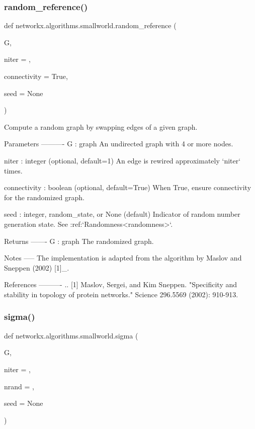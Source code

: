 \subsubsection{\texorpdfstring{random\+\_\+reference()}{random\_reference()}}
{\footnotesize\ttfamily def networkx.\+algorithms.\+smallworld.\+random\+\_\+reference (\begin{DoxyParamCaption}\item[{}]{G,  }\item[{}]{niter = {},  }\item[{}]{connectivity = {\ttfamily True},  }\item[{}]{seed = {\ttfamily None} }\end{DoxyParamCaption})}

\begin{DoxyVerb}Compute a random graph by swapping edges of a given graph.

Parameters
----------
G : graph
    An undirected graph with 4 or more nodes.

niter : integer (optional, default=1)
    An edge is rewired approximately `niter` times.

connectivity : boolean (optional, default=True)
    When True, ensure connectivity for the randomized graph.

seed : integer, random_state, or None (default)
    Indicator of random number generation state.
    See :ref:`Randomness<randomness>`.

Returns
-------
G : graph
    The randomized graph.

Notes
-----
The implementation is adapted from the algorithm by Maslov and Sneppen
(2002) [1]_.

References
----------
.. [1] Maslov, Sergei, and Kim Sneppen.
       "Specificity and stability in topology of protein networks."
       Science 296.5569 (2002): 910-913.
\end{DoxyVerb}
 \mbox{\label{namespacenetworkx_1_1algorithms_1_1smallworld_a4bce7f8ef34970dbdbe4e20991db7b19}} 
\subsubsection{\texorpdfstring{sigma()}{sigma()}}
{\footnotesize\ttfamily def networkx.\+algorithms.\+smallworld.\+sigma (\begin{DoxyParamCaption}\item[{}]{G,  }\item[{}]{niter = {},  }\item[{}]{nrand = {},  }\item[{}]{seed = {\ttfamily None} }\end{DoxyParamCaption})}

